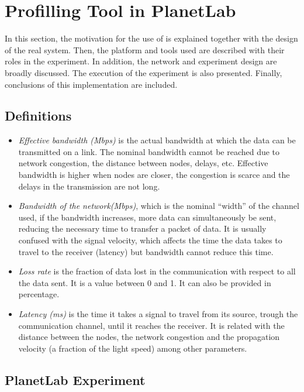 
\section{Profilling Tool in PlanetLab}

In this section, the motivation for the use of \pl is explained together
with the design of the real system. Then, the platform and tools used are
described with their roles in the experiment. In addition, the network and
experiment design are broadly discussed. The execution of the experiment is also
presented. Finally, conclusions of this implementation are included.


\subsection{Definitions}
\begin{itemize}
\item\emph{Effective bandwidth (Mbps)} is the actual bandwidth at which the data
  can be transmitted on a link. The nominal bandwidth cannot be reached due to
  network congestion, the distance between nodes, delays, etc. Effective bandwidth is higher when nodes are closer, the congestion is scarce and the delays in the transmission are not long.
\item\emph{Bandwidth of the network(Mbps)}, which is the nominal ``width'' of the channel used, if the bandwidth increases, more data can simultaneously be sent, reducing the necessary time to transfer a packet of data. It is usually confused with the signal velocity, which affects the time the data takes to travel to the receiver (latency) but bandwidth cannot reduce this time.
\item\emph{Loss rate} is the fraction of data lost in the communication with respect
to all the data sent. It is a value between 0 and 1. It can also be provided in
percentage.

\item\emph{Latency (ms)} is the time it takes a signal to travel from its source, trough the communication channel, until it reaches the receiver. It is related with the distance between the nodes, the network congestion and the propagation velocity (a fraction of the light speed) among other parameters. 
\end{itemize}

\subsection{PlanetLab Experiment}

